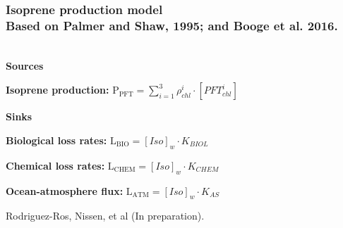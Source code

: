 \documentclass{beamer}
\begin{document}

\begin{frame}
\frametitle{Isoprene production model \\ Based on Palmer and Shaw, 1995; and Booge et al. 2016.}
\begin{center}
 \\

\bigskip
\textbf{Sources}\\
\bigskip

\textbf{Isoprene production:} $\mathrm{P}_{\mathrm{PFT}} = \sum^{3}_{i=1}\rho^{i}_{chl} \cdot [PFT^{i}_{chl}]$\\
\bigskip

\textbf{Sinks}\\
\bigskip

\textbf{Biological loss rates:} $\mathrm{L}_{\mathrm{BIO}} = [Iso]_{w} \cdot K_{BIOL}$\\
\bigskip

\textbf{Chemical loss rates:} $\mathrm{L}_{\mathrm{CHEM}} = [Iso]_{w} \cdot K_{CHEM}$\\
\bigskip

 \textbf{Ocean-atmosphere flux:} $\mathrm{L}_{\mathrm{ATM}} = [Iso]_{w} \cdot K_{AS}$

\end{center}
\tiny  Rodriguez-Ros, Nissen, et al (In preparation).

\end{frame}

\end{document}
